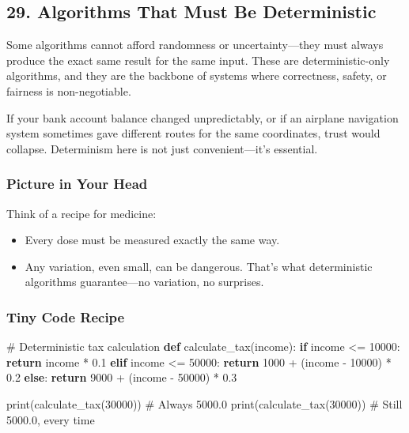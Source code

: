 \documentclass[
  letterpaper,
  DIV=11,
  numbers=noendperiod]{scrreprt}
\newenvironment{Shaded}{\begin{snugshade}}{\end{snugshade}}
\newcommand{\BuiltInTok}[1]{\textcolor[rgb]{0.00,0.23,0.31}{#1}}
\newcommand{\CommentTok}[1]{\textcolor[rgb]{0.37,0.37,0.37}{#1}}
\newcommand{\ControlFlowTok}[1]{\textcolor[rgb]{0.00,0.23,0.31}{\textbf{#1}}}
\newcommand{\DecValTok}[1]{\textcolor[rgb]{0.68,0.00,0.00}{#1}}
\newcommand{\FloatTok}[1]{\textcolor[rgb]{0.68,0.00,0.00}{#1}}
\newcommand{\KeywordTok}[1]{\textcolor[rgb]{0.00,0.23,0.31}{\textbf{#1}}}
\newcommand{\NormalTok}[1]{\textcolor[rgb]{0.00,0.23,0.31}{#1}}
\newcommand{\OperatorTok}[1]{\textcolor[rgb]{0.37,0.37,0.37}{#1}}
\providecommand{\tightlist}{%
  \setlength{\itemsep}{0pt}\setlength{\parskip}{0pt}}
\begin{document}
\subsection{29. Algorithms That Must Be
Deterministic}\label{algorithms-that-must-be-deterministic}

Some algorithms cannot afford randomness or uncertainty---they must
always produce the exact same result for the same input. These are
deterministic-only algorithms, and they are the backbone of systems
where correctness, safety, or fairness is non-negotiable.

If your bank account balance changed unpredictably, or if an airplane
navigation system sometimes gave different routes for the same
coordinates, trust would collapse. Determinism here is not just
convenient---it's essential.

\subsubsection{Picture in Your Head}\label{picture-in-your-head-28}

Think of a recipe for medicine:

\begin{itemize}
\tightlist
\item
  Every dose must be measured exactly the same way.
\item
  Any variation, even small, can be dangerous. That's what deterministic
  algorithms guarantee---no variation, no surprises.
\end{itemize}

\subsubsection{Tiny Code Recipe}\label{tiny-code-recipe-26}

\begin{Shaded}
\begin{Highlighting}[]
\CommentTok{\# Deterministic tax calculation}
\KeywordTok{def}\NormalTok{ calculate\_tax(income):}
    \ControlFlowTok{if}\NormalTok{ income }\OperatorTok{\textless{}=} \DecValTok{10000}\NormalTok{:}
        \ControlFlowTok{return}\NormalTok{ income }\OperatorTok{*} \FloatTok{0.1}
    \ControlFlowTok{elif}\NormalTok{ income }\OperatorTok{\textless{}=} \DecValTok{50000}\NormalTok{:}
        \ControlFlowTok{return} \DecValTok{1000} \OperatorTok{+}\NormalTok{ (income }\OperatorTok{{-}} \DecValTok{10000}\NormalTok{) }\OperatorTok{*} \FloatTok{0.2}
    \ControlFlowTok{else}\NormalTok{:}
        \ControlFlowTok{return} \DecValTok{9000} \OperatorTok{+}\NormalTok{ (income }\OperatorTok{{-}} \DecValTok{50000}\NormalTok{) }\OperatorTok{*} \FloatTok{0.3}

\BuiltInTok{print}\NormalTok{(calculate\_tax(}\DecValTok{30000}\NormalTok{))  }\CommentTok{\# Always 5000.0}
\BuiltInTok{print}\NormalTok{(calculate\_tax(}\DecValTok{30000}\NormalTok{))  }\CommentTok{\# Still 5000.0, every time}
\end{Highlighting}
\end{Shaded}
\end{document}
